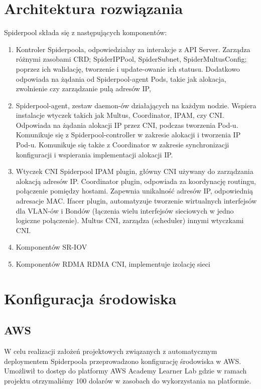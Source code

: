 \documentclass[onecolumn,12pt]{article}
\begin{document}
\section{Architektura rozwiązania}
Spiderpool składa się z następujących komponentów:
\begin{enumerate}
    \item Kontroler Spiderpoola, odpowiedzialny za interakcje z API Server. Zarządza różnymi zasobami CRD; SpiderIPPool, SpiderSubnet, SpiderMultusConfig; poprzez ich walidację, tworzenie i update-owanie ich statusu. Dodatkowo odpowiada na żądania od Spiderpool-agent Pods, takie jak alokacja, zwolnienie czy zarządzanie pulą adresów IP, 
    \item Spiderpool-agent, zestaw daemon-ów działających na każdym nodzie. Wspiera instalacje wtyczek takich jak Multus, Coordinator, IPAM, czy CNI. Odpowiada na żądania alokacji IP przez CNI, podczas tworzenia Pod-u. Komunikuje się z Spiderpool-controller w zakresie alokacji i tworzenia IP Pod-u. Komunikuje się także z Coordinator w zakresie synchronizacji konfiguracji i wspierania implementacji alokacji IP.
    \item Wtyczek CNI
    \newline Spiderpool IPAM plugin, główny CNI używany do zarządzania alokacją adresów IP.
    \newline Coordinator plugin, odpowiada za koordynację routingu, połączenie pomiędzy hostami. Zapewnia unikalność adresów IP, odpowiednią adresacje MAC.
    \newline Ifacer plugin, automatyzuje tworzenie wirtualnych interfejsów dla VLAN-ów i Bondów (łączenia wielu interfejsów sieciowych w jedno logiczne połączenie).
    \newline Multus CNI, zarządza (scheduler) innymi wtyczkami CNI.
    \item Komponentów SR-IOV
    \item Komponentów RDMA
    \newline RDMA CNI, implementuje izolację sieci
\end{enumerate}


\section{Konfiguracja środowiska}

\subsection{AWS}
W celu realizacji założeń projektowych związanych z automatycznym deploymentem Spiderpoola 
przeprowadzono konfigurację środowiska w AWS. Umożliwił to dostęp do platformy AWS Academy Learner
Lab gdzie w ramach projektu otrzymaliśmy 100 dolarów w zasobach do wykorzystania na platformie. 
\end{document}

